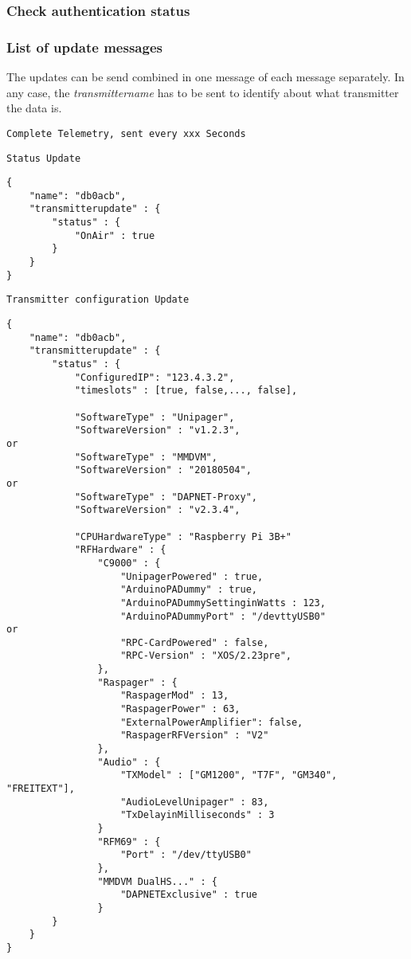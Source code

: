 \documentclass[a4paper]{article}
\begin{document}
\subsubsection{Check authentication status}
 
\subsubsection{List of update messages}
The updates can be send combined in one message of each message separately. In any case, the \textit{transmittername} has to be sent to identify about what transmitter the data is.

\texttt{Complete Telemetry, sent every xxx Seconds}

\texttt{Status Update}
\begin{lstlisting}
{
    "name": "db0acb",
    "transmitterupdate" : {
        "status" : {
            "OnAir" : true
        }
    }
}
\end{lstlisting}

\texttt{Transmitter configuration Update}
\begin{lstlisting}
{
    "name": "db0acb",
	"transmitterupdate" : {
		"status" : {
			"ConfiguredIP": "123.4.3.2",
            "timeslots" : [true, false,...,	false],
            
			"SoftwareType" : "Unipager",
            "SoftwareVersion" : "v1.2.3",
or
			"SoftwareType" : "MMDVM",
			"SoftwareVersion" : "20180504",
or
			"SoftwareType" : "DAPNET-Proxy",
			"SoftwareVersion" : "v2.3.4",
            
			"CPUHardwareType" : "Raspberry Pi 3B+"
			"RFHardware" : {
				"C9000" : {
					"UnipagerPowered" : true,
					"ArduinoPADummy" : true,
                    "ArduinoPADummySettinginWatts : 123,
                    "ArduinoPADummyPort" : "/devttyUSB0"
or
                    "RPC-CardPowered" : false,
                    "RPC-Version" : "XOS/2.23pre",
                },
                "Raspager" : {
                    "RaspagerMod" : 13,
                    "RaspagerPower" : 63,
                    "ExternalPowerAmplifier": false,
                    "RaspagerRFVersion" : "V2"
                },
                "Audio" : {
                    "TXModel" : ["GM1200", "T7F", "GM340", "FREITEXT"],
                    "AudioLevelUnipager" : 83,
                    "TxDelayinMilliseconds" : 3
                }
                "RFM69" : {
                	"Port" : "/dev/ttyUSB0"
                },
                "MMDVM DualHS..." : {
                    "DAPNETExclusive" : true
                }
        }
    }
}
\end{lstlisting}
\end{document}
